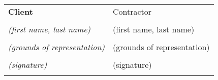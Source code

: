 
\mbox{}\vfill %
\begin{tabu}{X X} \tabucline{}
	\rowfont[c]\bfseries Client & Contractor \\
	[10pt]\makebox[8cm]{\hrulefill} & \makebox[8cm]{\hrulefill} \\
	\rowfont[c]\itshape (first name, last name) & (first name, last name) \\
	[10pt]\makebox[8cm]{\hrulefill} & \makebox[8cm]{\hrulefill} \\
	\rowfont[c]\itshape (grounds of representation) & (grounds of representation) \\
	[10pt]\makebox[8cm]{\hrulefill} & \makebox[8cm]{\hrulefill} \\
	\rowfont[c]\itshape (signature) & (signature) \\[4cm] \\
\end{tabu}
\pagebreak
